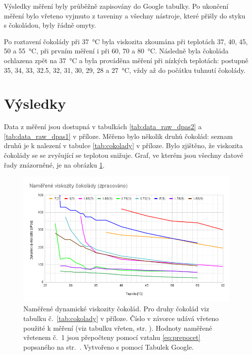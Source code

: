 \documentclass[12pt]{article}
\begin{document}
Výsledky měření byly průběžně zapisovány do Google tabulky. Po ukončení měření bylo vřeteno vyjmuto z taveniny a všechny nástroje, které přišly do styku s čokoládou, byly řádně omyty.
\par
Po roztavení čokolády při \SI{37}{\degreeCelsius} byla viskozita zkoumána při teplotách \SI{37}{}, \SI{40}{}, \SI{45}{}, \SI{50}{} a \SI{55}{\degreeCelsius}, při prvním měření i při \SI{60}{}, \SI{70}{} a \SI{80}{\degreeCelsius}. Následně byla čokoláda ochlazena zpět na \SI{37}{\degreeCelsius} a byla prováděna měření při nízkých teplotách: postupně \SI{35}{}, \SI{34}{}, \SI{33}{}, \SI{32,5}{}, \SI{32}{}, \SI{31}{}, \SI{30}{}, \SI{29}{}, \SI{28}{} a \SI{27}{\degreeCelsius}, vždy až do počátku tuhnutí čokolády.

\newpage
\section{Výsledky}

Data z měření jsou dostupná v tabulkách \ref{tab:data_raw_dpas2} a \ref{tab:data_raw_dpas1} v příloze. Měřeno bylo několik druhů čokolád: seznam druhů je k nalezení v tabulce \ref{tab:cokolady} v příloze. Bylo zjištěno, že viskozita čokolády se se zvyšující se teplotou snižuje. Graf, ve kterém jsou všechny datové řady znázorněné, je na obrázku \ref{fig:data_zprac}.
\begin{figure}[h!]
    \centering
    \includegraphics[width = \linewidth]{figures/data_zpracovano.png}
    \caption{Naměřené dynamické viskozity čokolád. Pro druhy čokolád viz tabulku č.~\ref{tab:cokolady} v příloze. Číslo v závorce udává vřeteno použité k měření (viz tabulku vřeten, str. \pageref{tab:vretena}). Hodnoty naměřené vřetenem č.~1 jsou přepočteny pomocí vztahu \ref{eq:prepocet} popsaného na str.~\pageref{eq:prepocet}. Vytvořeno s pomocí Tabulek Google.}
    \label{fig:data_zprac}
\end{figure}
\end{document}
